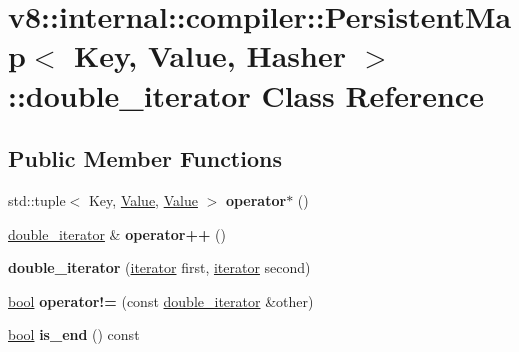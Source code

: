 \hypertarget{classv8_1_1internal_1_1compiler_1_1PersistentMap_1_1double__iterator}{}\section{v8\+:\+:internal\+:\+:compiler\+:\+:Persistent\+Map$<$ Key, Value, Hasher $>$\+:\+:double\+\_\+iterator Class Reference}
\label{classv8_1_1internal_1_1compiler_1_1PersistentMap_1_1double__iterator}
\subsection*{Public Member Functions}
\begin{DoxyCompactItemize}
\item 
\mbox{\label{classv8_1_1internal_1_1compiler_1_1PersistentMap_1_1double__iterator_a0140a42bded7fd01bae666d23d3e25a2}} 
std\+::tuple$<$ Key, \mbox{\hyperlink{classv8_1_1Value}{Value}}, \mbox{\hyperlink{classv8_1_1Value}{Value}} $>$ {\bfseries operator$\ast$} ()
\item 
\mbox{\label{classv8_1_1internal_1_1compiler_1_1PersistentMap_1_1double__iterator_a5e314cbb6a644d8b4d1f41b34de3ebe1}} 
\mbox{\hyperlink{classv8_1_1internal_1_1compiler_1_1PersistentMap_1_1double__iterator}{double\+\_\+iterator}} \& {\bfseries operator++} ()
\item 
\mbox{\label{classv8_1_1internal_1_1compiler_1_1PersistentMap_1_1double__iterator_a9b794a2a76f84c10d26e5ee4e41e41b4}} 
{\bfseries double\+\_\+iterator} (\mbox{\hyperlink{classv8_1_1internal_1_1compiler_1_1PersistentMap_1_1iterator}{iterator}} first, \mbox{\hyperlink{classv8_1_1internal_1_1compiler_1_1PersistentMap_1_1iterator}{iterator}} second)
\item 
\mbox{\label{classv8_1_1internal_1_1compiler_1_1PersistentMap_1_1double__iterator_afbc6989a27a0af694eb3d8d92e84e4e0}} 
\mbox{\hyperlink{classbool}{bool}} {\bfseries operator!=} (const \mbox{\hyperlink{classv8_1_1internal_1_1compiler_1_1PersistentMap_1_1double__iterator}{double\+\_\+iterator}} \&other)
\item 
\mbox{\label{classv8_1_1internal_1_1compiler_1_1PersistentMap_1_1double__iterator_a141f4d2b38a0a789c0efdb4b4ae75502}} 
\mbox{\hyperlink{classbool}{bool}} {\bfseries is\+\_\+end} () const
\end{DoxyCompactItemize}


